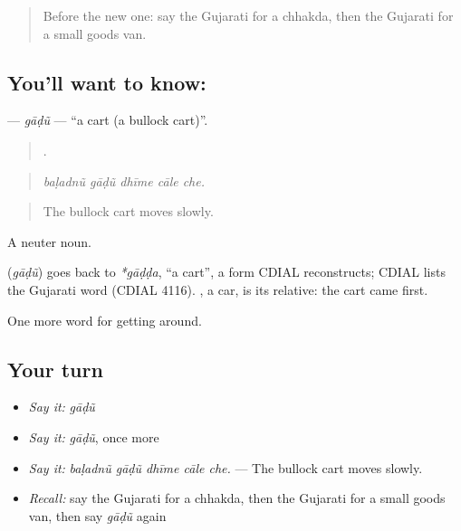 \label{lesson:GU-C402-gadu}



\begin{quote}
Before the new one: say the Gujarati for a chhakda, then the Gujarati for a small goods van.
\end{quote}

\subsection*{You'll want to know: }
\textbf{} — \emph{gāḍũ} — \textquotedblleft{}a cart (a bullock cart)\textquotedblright{}.

\begin{quote}
    .
\end{quote}

\begin{quote}
\emph{baḷadnũ gāḍũ dhīme cāle che.}
\end{quote}

\begin{quote}
The bullock cart moves slowly.
\end{quote}

A neuter noun.

\begin{cousinweb}
\textbf{} (\emph{gāḍũ}) goes back to \emph{*gāḍḍa}, \textquotedblleft{}a cart\textquotedblright{}, a form CDIAL reconstructs; CDIAL lists the Gujarati word (CDIAL 4116). , a car, is its relative: the cart came first.
\end{cousinweb}

\begin{grammarlens}[title={What you've built}]
One more word for getting around.
\end{grammarlens}

\subsection*{Your turn}
\begin{itemize}
\raggedright
  \item \emph{Say it:} \emph{gāḍũ}
  \item \emph{Say it:} \emph{gāḍũ}, once more
  \item \emph{Say it:} \emph{baḷadnũ gāḍũ dhīme cāle che.} — The bullock cart moves slowly.
  \item \emph{Recall:} say the Gujarati for a chhakda, then the Gujarati for a small goods van, then say \emph{gāḍũ} again
\end{itemize}

